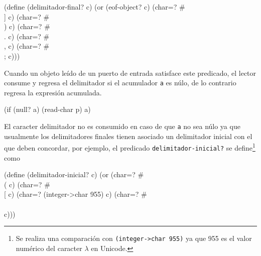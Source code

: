 \documentclass[letterpaper,twoside,openright,10pt]{book}
\begin{document}
\nwenddocs{}\endmoddef
(define (delimitador-final? c)
  (or (eof-object? c)
      (char=? #\\] c)
      (char=? #\\) c)
      (char=? #\\. c)
      (char=? #\\, c)
      (char=? #\\; c)))

\eatline
{}\nwendcode{}\nwdocspar

Cuando un objeto leído de un puerto de entrada satisface este predicado, el lector consume y regresa el delimitador si el acumulador {\tt{}a} es núlo, de lo contrario regresa la expresión acumulada.

\nwenddocs{}\endmoddef
(if (null? a) (read-char p) a)
\nwendcode{}\nwdocspar

El caracter delimitador no es consumido en caso de que {\tt{}a} no sea núlo ya que usualmente los delimitadores finales tienen asociado un delimitador inicial con el que deben concordar, por ejemplo, el predicado {\tt{}\protect{}delimitador-inicial?} se define\footnote{Se realiza una comparación con {\tt{}(integer->char\ 955)} ya que 955 es el valor numérico del caracter \( λ \) en Unicode.} como

\nwenddocs{}\plusendmoddef
(define (delimitador-inicial? c)
  (or (char=? #\\( c)
      (char=? #\\[ c)
      (char=? (integer->char 955) c)
      (char=? #\\\\ c)))
\end{document}
